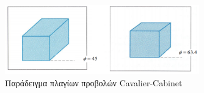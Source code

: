 \begin{figure}[h]
\centering
\includegraphics[width=0.75\textwidth]{images/projectionCabinet-Cavalier}
\caption{Παράδειγμα πλαγίων προβολών \textlatin{Cavalier}-\textlatin{Cabinet} }
\end{figure}